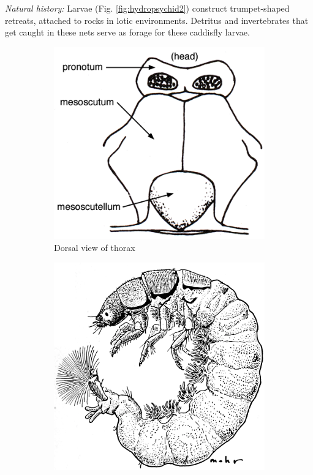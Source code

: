 \documentclass[letterpaper, 11pt]{article}
\begin{document}
\noindent{}\textit{Natural history:} Larvae (Fig. \ref{fig:hydropsychid2}) construct trumpet-shaped retreats, attached to rocks in lotic environments. Detritus and invertebrates that get caught in these nets serve as forage for these caddisfly larvae. 

\begin{figure}[ht!]
    \centering
    \begin{subfigure}[ht!]{0.36\textwidth}
        \includegraphics[width=\textwidth]{TrichoImage03}
        \caption{Dorsal view of thorax \citep[][Fig. 80]{bhl50956}}
        \label{fig:hydropsychid1}
    \end{subfigure}
    \hfill 
    \begin{subfigure}[ht!]{0.4\textwidth}
        \includegraphics[width=\textwidth]{HydropsychidLarva}%

\end{subfigure}
\end{figure}
\end{document}
